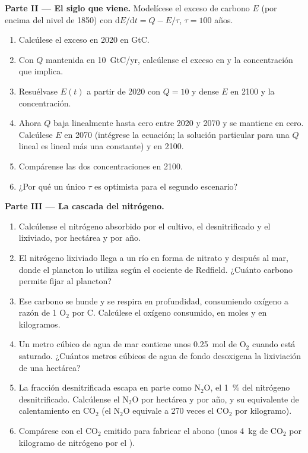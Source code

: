\begin{problem}
\medskip
\noindent\textbf{Parte II --- El siglo que viene.}
Modelícese el exceso de carbono $E$ (por encima del nivel de 1850) con
$\mathrm{d}E/\mathrm{d}t = Q - E/\tau$, $\tau = 100$ años.
\begin{enumerate}[resume]
  \item Calcúlese el exceso en 2020 en GtC.
  \item Con $Q$ mantenida en \qty{10}{GtC/yr}, calcúlense el exceso en
         y la concentración que implica.
  \item Resuélvase $E(t)$ a partir de 2020 con $Q = 10$ y dense $E$ en
        2100 y la concentración.
  \item Ahora $Q$ baja linealmente hasta cero entre 2020 y 2070 y se
        mantiene en cero. Calcúlese $E$ en 2070 (intégrese la ecuación; la
        solución particular para una $Q$ lineal es lineal más una
        constante) y en 2100.
  \item Compárense las dos concentraciones en 2100.
  \item ¿Por qué un único $\tau$ es optimista para el segundo escenario?
\end{enumerate}

\medskip
\noindent\textbf{Parte III --- La cascada del nitrógeno.}
\begin{enumerate}[resume]
  \item Calcúlense el nitrógeno absorbido por el cultivo, el desnitrificado
        y el lixiviado, por hectárea y por año.
  \item El nitrógeno lixiviado llega a un río en forma de nitrato y
        después al mar, donde el plancton lo utiliza según el cociente de
        Redfield. ¿Cuánto carbono permite fijar al plancton?
  \item Ese carbono se hunde y se respira en profundidad, consumiendo
        oxígeno a razón de 1 $\mathrm{O_2}$ por C. Calcúlese el oxígeno
        consumido, en moles y en kilogramos.
  \item Un metro cúbico de agua de mar contiene unos \qty{0.25}{mol} de
        $\mathrm{O_2}$ cuando está saturado. ¿Cuántos metros cúbicos de
        agua de fondo desoxigena la lixiviación de una hectárea?
  \item La fracción desnitrificada escapa en parte como $\mathrm{N_2O}$,
        el \qty{1}{\%} del nitrógeno desnitrificado. Calcúlense el $\mathrm{N_2O}$
        por hectárea y por año, y su equivalente de calentamiento en $\mathrm{CO_2}$
        (el $\mathrm{N_2O}$ equivale a 270 veces el $\mathrm{CO_2}$ por kilogramo).
  \item Compárese con el $\mathrm{CO_2}$ emitido para fabricar el abono
        (unos \qty{4}{kg} de $\mathrm{CO_2}$ por kilogramo de nitrógeno por
        el ).
\end{enumerate}


\end{problem}
